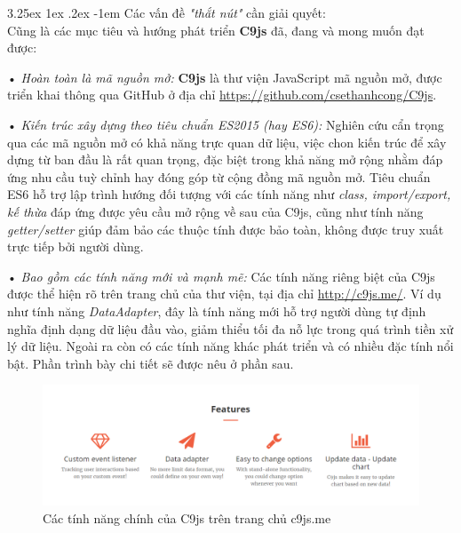 \documentclass[12pt,a4paper]{article}
\makeatletter
\newcommand{\myparagraph}[1]{\paragraph{#1}\mbox{}\\} %
\renewcommand\paragraph{\@startsection{paragraph}{5}{\z@}%
  {3.25ex \@plus1ex \@minus.2ex}%
  {-1em}%
  {\normalfont\normalsize\bfseries}}
\makeatother
\begin{document}
\myparagraph{Các vấn đề \textit{"thắt nút"} cần giải quyết:}
Cũng là các mục tiêu và hướng phát triển \textbf{C9js} đã, đang và mong muốn đạt được: 
\begin{list}{}{}
\item[•] \emph{Hoàn toàn là mã nguồn mở:} \textbf{C9js} là thư viện JavaScript mã nguồn mở, được triển khai thông qua GitHub ở địa chỉ \url{https://github.com/csethanhcong/C9js}.

\item[•] \emph{Kiến trúc xây dựng theo tiêu chuẩn ES2015 (hay ES6):} Nghiên cứu cẩn trọng qua các mã nguồn mở có khả năng trực quan dữ liệu, việc chon kiến trúc để xây dựng từ ban đầu là rất quan trọng, đặc biệt trong khả năng mở rộng nhằm đáp ứng nhu cầu tuỳ chỉnh hay đóng góp từ cộng đồng mã nguồn mở. Tiêu chuẩn ES6 hỗ trợ lập trình hướng đối tượng với các tính năng như \textit{class, import/export, kế thừa} đáp ứng được yêu cầu mở rộng về sau của C9js, cũng như tính năng \textit{getter/setter} giúp đảm bảo các thuộc tính được bảo toàn, không được truy xuất trực tiếp bởi người dùng.

\item[•] \emph{Bao gồm các tính năng mới và mạnh mẽ:}
Các tính năng riêng biệt của C9js được thể hiện rõ trên trang chủ của thư viện, tại địa chỉ \url{http://c9js.me/}. Ví dụ như tính năng \textit{DataAdapter}, đây là tính năng mới hỗ trợ người dùng tự định nghĩa định dạng dữ liệu đầu vào, giảm thiểu tối đa nỗ lực trong quá trình tiền xử lý dữ liệu. Ngoài ra còn có các tính năng khác phát triển và có nhiều đặc tính nổi bật. Phần trình bày chi tiết sẽ được nêu ở phần sau.

\begin{figure}[htp]
	\begin{center}
    \includegraphics[scale=.5]{image/c9js_feature}
    \caption{Các tính năng chính của C9js trên trang chủ c9js.me}
    \label{fig:c9js_feature}
	\end{center}
\end{figure}

\end{list}
\end{document}
